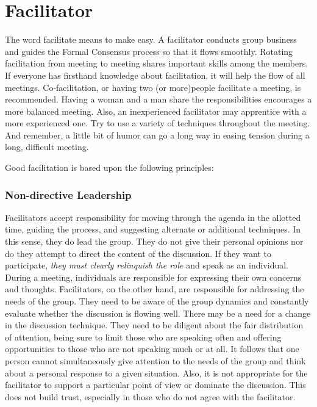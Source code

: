 \clearpage

\section{Facilitator}
\label{role:facilitator}

The word facilitate means to make easy. A facilitator conducts
group business and guides the Formal Consensus process so that it
flows smoothly. Rotating facilitation from meeting to meeting
shares important skills among the members. If everyone has
firsthand knowledge about facilitation, it will help the flow of
all meetings. Co-facilitation, or having two (or more)people
facilitate a meeting, is recommended. Having a woman and a man
share the responsibilities encourages a more balanced
meeting. Also, an inexperienced facilitator may apprentice with a
more experienced one. Try to use a variety of techniques throughout
the meeting. And remember, a little bit of humor can go a long way
in easing tension during a long, difficult meeting.

Good facilitation is based upon the following principles:

\subsubsection*{Non-directive Leadership}

Facilitators accept responsibility for moving through the agenda
in the allotted time, guiding the process, and suggesting alternate
or additional techniques. In this sense, they do lead the
group. They do not give their personal opinions nor do
they attempt to direct the content of the discussion. If they want
to participate, \emph{they must clearly relinquish the role} and
speak as an individual. During a meeting, individuals are
responsible for expressing their own concerns and
thoughts. Facilitators, on the other hand, are responsible for
addressing the needs of the group.  They need to be aware of the
group dynamics and constantly evaluate whether the discussion is
flowing well. There may be a need for a change in the discussion
technique. They need to be diligent about the fair distribution of
attention, being sure to limit those who are speaking often and
offering opportunities to those who are not speaking much or at
all. It follows that one person cannot simultaneously give
attention to the needs of the group and think about a personal
response to a given situation. Also, it is not appropriate for the
facilitator to support a particular point of view or dominate the
discussion. This does not build trust, especially in those who do
not agree with the facilitator.

